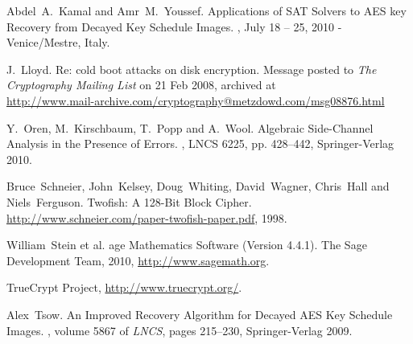 \documentclass{llncs}
\begin{document}
\begin{thebibliography}{99}
Abdel~A.~Kamal and Amr~M.~Youssef.
\newblock Applications of SAT Solvers to AES key Recovery from Decayed Key Schedule Images.
,
\newblock  July 18 -- 25, 2010 - Venice/Mestre, Italy. 

J.~Lloyd. Re: cold boot attacks on disk encryption.
\newblock Message posted to {\it The Cryptography Mailing List} on 21 Feb 2008, archived at\\
\newblock \url{http://www.mail-archive.com/cryptography@metzdowd.com/msg08876.html}

Y.~Oren, M.~Kirschbaum, T.~Popp and A.~Wool.
\newblock Algebraic Side-Channel Analysis in the Presence of Errors. 
, LNCS 6225, pp. 428--442, Springer-Verlag 2010.

Bruce~Schneier, John~Kelsey, Doug~Whiting, David~Wagner, Chris~Hall and Niels~Ferguson.
\newblock Twofish: A 128-Bit {B}lock {C}ipher.
\newblock \url{http://www.schneier.com/paper-twofish-paper.pdf}, 1998.

William~Stein et al.
age {M}athematics {S}oftware (Version 4.4.1).
\newblock The Sage Development Team, 2010, \url{http://www.sagemath.org}.
       
TrueCrypt Project, \url{http://www.truecrypt.org/}.

Alex~Tsow.
\newblock An Improved Recovery Algorithm for Decayed AES Key Schedule Images.
, volume 5867 of {\em LNCS}, pages 215--230,  Springer-Verlag 2009.

\end{thebibliography}
\newpage 
\appendix


\begin{algorithm}[HTBP]
\SetLine
{}
\caption{$h$}
\label{alg:h}
\end{algorithm}
\end{document}
